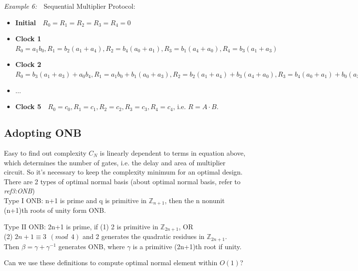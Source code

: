 \documentclass[conference]{IEEEtran}
\begin{document}
\textit{Example 6:}\ \ Sequential Multiplier Protocol:
\begin{itemize}
\item \textbf{Initial}\ \ $R_0 = R_1 = R_2 = R_3 = R_4 = 0$
\item \textbf{Clock 1}\ \ $R_0 = a_1b_0, R_1 = b_2(a_1 + a_4), R_2 = b_4(a_0 + a_1), R_3 = b_1(a_4 + a_0), 
			R_4 = b_3(a_1 + a_3)$
\item \textbf{Clock 2}\ \ $R_0 = b_3(a_1 + a_3) + a_0b_4, R_1 = a_1b_0 + b_1(a_0 + a_3), R_2 = b_2(a_1 + a_4)
			+ b_3(a_4 + a_0), R_3 = b_4(a_0 + a_1) + b_0(a_3 + a_4), R_4 = b_1(a_4 + a_0) + b_2(a_0 + a_2)$
\item \textbf{$\dots$}
\item \textbf{Clock 5}\ \ $R_0 = c_0, R_1 = c_1, R_2 = c_2, R_3 = c_3, R_4 = c_4$, i.e. $R = A\cdot B$.
\end{itemize}

	\subsection{Adopting ONB}
Easy to find out complexity $C_N$ is linearly dependent to terms in equation above, which determines the number
of gates, i.e. the delay and area of multiplier circuit. So it's necessary to keep the complexity minimum for an
optimal design. \\
There are 2 types of optimal normal basis (about optimal normal basis, refer to \textit{ref3:ONB})\\
Type I ONB: n+1 is prime and q is primitive in $\mathbb{Z}_{n+1}$, then the n nonunit (n+1)th roots of unity form ONB.\\
\hspace{8mm}\par
Type II ONB: 2n+1 is prime, if (1) 2 is primitive in $\mathbb{Z}_{2n+1}$, OR \\
(2) $2n + 1 \equiv 3\ \ (mod\ \  4)$ and 2 generates the quadratic residues in $\mathbb{Z}_{2n+1}$.\\
Then $\beta = \gamma + \gamma^{-1}$ generates ONB, where $\gamma$ is a primitive (2n+1)th root if unity.\\
\hspace{8mm}\par
Can we use these definitions to compute optimal normal element within $O(1)$?
\end{document}
